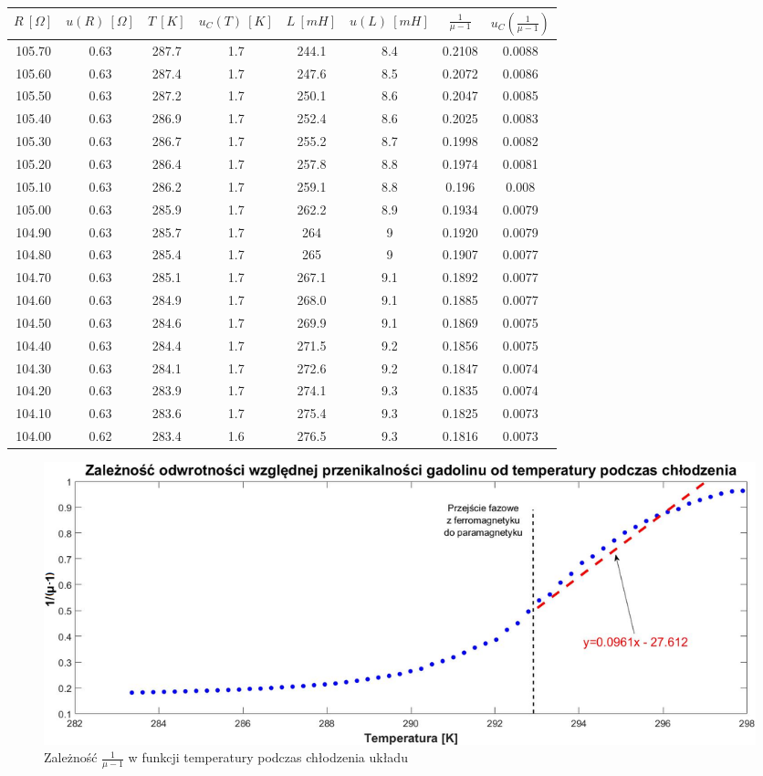 \documentclass[12pt, a4paper, oneside]{article}
\begin{document}
\begin{longtable}{|c|c|c|c|c|c|c|c|}
    $R~[\Omega]$ & $u(R)~[\Omega]$ & $T~[K]$ & $u_C(T)~[K]$ & $L~[mH]$ & 
    $u(L)~[mH]$ & $\frac{1}{\mu-1}$ & $u_C(\frac{1}{\mu-1})$ \\\hline
    105.70 & 0.63 & 287.7 & 1.7 & 244.1 & 8.4 & 0.2108 & 0.0088 \\\hline
    105.60 & 0.63 & 287.4 & 1.7 & 247.6 & 8.5 & 0.2072 & 0.0086 \\\hline
    105.50 & 0.63 & 287.2 & 1.7 & 250.1 & 8.6 & 0.2047 & 0.0085 \\\hline
    105.40 & 0.63 & 286.9 & 1.7 & 252.4 & 8.6 & 0.2025 & 0.0083 \\\hline
    105.30 & 0.63 & 286.7 & 1.7 & 255.2 & 8.7 & 0.1998 & 0.0082 \\\hline
    105.20 & 0.63 & 286.4 & 1.7 & 257.8 & 8.8 & 0.1974 & 0.0081 \\\hline
    105.10 & 0.63 & 286.2 & 1.7 & 259.1 & 8.8 & 0.196 & 0.008 \\\hline
    105.00 & 0.63 & 285.9 & 1.7 & 262.2 & 8.9 & 0.1934 & 0.0079 \\\hline
    104.90 & 0.63 & 285.7 & 1.7 & 264 & 9 & 0.1920 & 0.0079 \\\hline
    104.80 & 0.63 & 285.4 & 1.7 & 265 & 9 & 0.1907 & 0.0077 \\\hline
    104.70 & 0.63 & 285.1 & 1.7 & 267.1 & 9.1 & 0.1892 & 0.0077 \\\hline
    104.60 & 0.63 & 284.9 & 1.7 & 268.0 & 9.1 & 0.1885 & 0.0077 \\\hline
    104.50 & 0.63 & 284.6 & 1.7 & 269.9 & 9.1 & 0.1869 & 0.0075 \\\hline
    104.40 & 0.63 & 284.4 & 1.7 & 271.5 & 9.2 & 0.1856 & 0.0075 \\\hline
    104.30 & 0.63 & 284.1 & 1.7 & 272.6 & 9.2 & 0.1847 & 0.0074 \\\hline
    104.20 & 0.63 & 283.9 & 1.7 & 274.1 & 9.3 & 0.1835 & 0.0074 \\\hline
    104.10 & 0.63 & 283.6 & 1.7 & 275.4 & 9.3 & 0.1825 & 0.0073 \\\hline
    104.00 & 0.62 & 283.4 & 1.6 & 276.5 & 9.3 & 0.1816 & 0.0073 \\\hline
\end{longtable}%
\begin{figure}[h]
\centering
\caption{Zależność $\frac{1}{\mu-1}$ w funkcji temperatury podczas chłodzenia układu}
\includegraphics[scale=0.4]{f1.png}
\end{figure}
\end{document}
